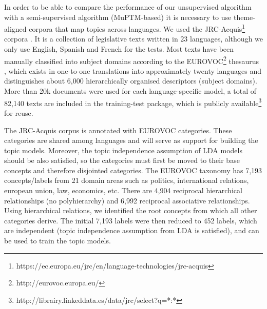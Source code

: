 In order to be able to compare the performance of our unsupervised algorithm with a semi-supervised algorithm (MuPTM-based) it is necessary to use theme-aligned corpora that map topics across languages. We used the JRC-Acquis\footnote{https://ec.europa.eu/jrc/en/language-technologies/jrc-acquis} corpora \citep{Steinberger2006}. It is a collection of legislative texts written in 23 languages, although we only use English, Spanish and French for the tests. Most texts have been manually classified into subject domains according to the EUROVOC\footnote{http://eurovoc.europa.eu/} thesaurus \citep{Eurovoc1995}, which exists in one-to-one translations into approximately twenty languages and distinguishes about 6,000 hierarchically organised descriptors (subject domains). More than 20k documents were used for each language-specific model, a total of 82,140 texts are included in the training-test package, which is publicly available\footnote{http://librairy.linkeddata.es/data/jrc/select?q=*:*} for reuse.

The JRC-Acquis corpus is annotated with EUROVOC categories. These categories are shared among languages and will serve as support for building the topic models. Moreover, the topic independence assumption \citep{Blei2003} of LDA models should be also satisfied, so the categories must first be moved to their base concepts and therefore disjointed categories. The EUROVOC taxonomy has 7,193 concepts/labels from 21 domain areas such as politics, international relations, european union, law, economics, etc. There are 4,904 reciprocal hierarchical relationships (no polyhierarchy) and 6,992 reciprocal associative relationships. Using hierarchical relations, we identified the root concepts from which all other categories derive. The initial 7,193 labels were then reduced to 452 labels, which are independent (topic independence assumption from LDA is satisfied), and can be used to train the topic models. 

